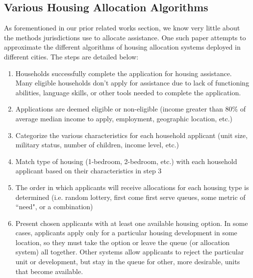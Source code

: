 \documentclass[11pt]{article}
\begin{document}
\subsection{Various Housing Allocation Algorithms}
As forementioned in our prior related works section, we know very little about the methods jurisdictions use to allocate assistance. One such paper attempts to approximate the different algorithms of housing allocation systems deployed in different cities. The steps are detailed below:
\begin{enumerate}
    \item Households successfully complete the application for housing assistance. Many eligible households don't apply for assistance due to lack of functioning abilities, language skills, or other tools needed to complete the application.
    \item Applications are deemed eligible or non-eligible (income greater than 80\% of average median income to apply, employment, geographic location, etc.)
    \item Categorize the various characteristics for each household applicant (unit size, military status, number of children, income level, etc.)
    \item Match type of housing (1-bedroom, 2-bedroom, etc.) with each household applicant based on their characteristics in step 3
    \item The order in which applicants will receive allocations for each housing type is determined (i.e. random lottery, first come first serve queues, some metric of ``need", or a combination)
    \item Present chosen applicants with at least one available housing option. In some cases, applicants apply only for a particular housing development in some location, so they must take the option or leave the queue (or allocation system) all together. Other systems allow applicants to reject the particular unit or development, but stay in the queue for other, more desirable, units that become available.
\end{enumerate}
\end{document}
